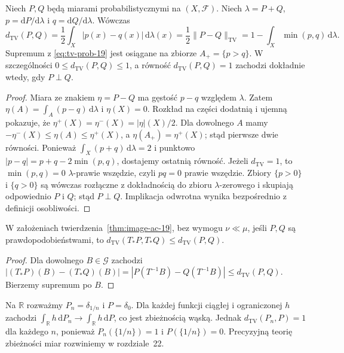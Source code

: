 \begin{twierdzenie}
\label{thm:total-variation-formula-19}
Niech $P,Q$ będą miarami probabilistycznymi na $(X,\mathcal F)$.
Niech $\lambda=P+Q$, $p=\mathrm dP/\mathrm d\lambda$
i $q=\mathrm dQ/\mathrm d\lambda$. Wówczas
\begin{equation}\label{eq:tv-formula-19}
 d_{\mathrm{TV}}(P,Q)
 =\frac12\int_X|p(x)-q(x)|\,\mathrm d\lambda(x)
 =\frac12\|P-Q\|_{\mathrm{TV}}
 =1-\int_X\min(p,q)\,\mathrm d\lambda.
\end{equation}
Supremum z \eqref{eq:tv-prob-19} jest osiągane na zbiorze
$A_+=\{p>q\}$. W szczególności $0\le d_{\mathrm{TV}}(P,Q)\le1$,
a równość $d_{\mathrm{TV}}(P,Q)=1$ zachodzi dokładnie wtedy,
gdy $P\perp Q$.
\end{twierdzenie}
\begin{proof}
Miara ze znakiem $\eta=P-Q$ ma gęstość $p-q$
względem $\lambda$. Zatem
$\eta(A)=\int_A(p-q)\,\mathrm d\lambda$ i
$\eta(X)=0$. Rozkład na części dodatnią i ujemną
pokazuje, że $\eta^+(X)=\eta^-(X)=|\eta|(X)/2$.
Dla dowolnego $A$ mamy
$-\eta^-(X)\le\eta(A)\le\eta^+(X)$,
a $\eta(A_+)=\eta^+(X)$; stąd pierwsze dwie równości.
Ponieważ $\int_X(p+q)\,\mathrm d\lambda=2$ i punktowo
$|p-q|=p+q-2\min(p,q)$, dostajemy ostatnią równość.
Jeżeli $d_{\mathrm{TV}}=1$, to $\min(p,q)=0$
$\lambda$-prawie wszędzie, czyli $p q=0$ prawie wszędzie.
Zbiory $\{p>0\}$ i $\{q>0\}$ są wówczas rozłączne
z dokładnością do zbioru $\lambda$-zerowego i skupiają
odpowiednio $P$ i $Q$; stąd $P\perp Q$.
Implikacja odwrotna wynika bezpośrednio z definicji osobliwości.
\end{proof}

\begin{wniosek}
\label{cor:tv-data-processing-19}
W założeniach twierdzenia~\ref{thm:image-ac-19},
bez wymogu $\nu\ll\mu$, jeśli $P,Q$ są prawdopodobieństwami,
to
$ d_{\mathrm{TV}}(T_*P,T_*Q)\le d_{\mathrm{TV}}(P,Q)$.
\end{wniosek}
\begin{proof}
Dla dowolnego $B\in\mathcal G$ zachodzi
$|(T_*P)(B)-(T_*Q)(B)|
=|P(T^{-1}B)-Q(T^{-1}B)|\le d_{\mathrm{TV}}(P,Q)$.
Bierzemy supremum po $B$.
\end{proof}

\begin{przyklad}
Na $\mathbb R$ rozważmy $P_n=\delta_{1/n}$ i $P=\delta_0$.
Dla każdej funkcji ciągłej i ograniczonej $h$
zachodzi $\int_{\mathbb R}h\,\mathrm dP_n\to
\int_{\mathbb R}h\,\mathrm dP$, co jest zbieżnością wąską.
Jednak $d_{\mathrm{TV}}(P_n,P)=1$ dla każdego $n$,
ponieważ $P_n(\{1/n\})=1$ i $P(\{1/n\})=0$.
Precyzyjną teorię zbieżności miar rozwiniemy w rozdziale~22.
\end{przyklad}

